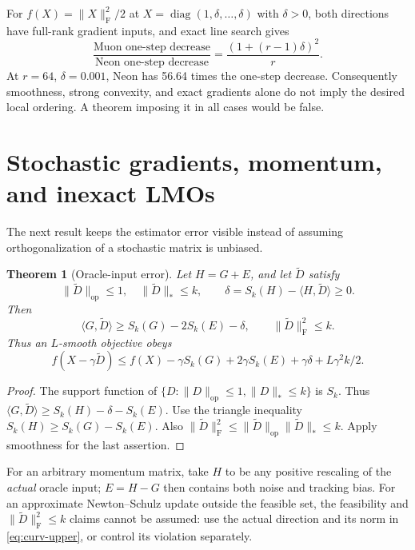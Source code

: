\documentclass[11pt]{article}
\newtheorem{theorem}{Theorem}[section]
\newcommand{\ip}[2]{\langle #1,#2\rangle}
\newcommand{\F}[1]{\lVert #1\rVert_{\mathrm F}}
\newcommand{\nuc}[1]{\lVert #1\rVert_*}
\newcommand{\op}[1]{\lVert #1\rVert_{\mathrm{op}}}
\begin{document}
For $f(X)=\F X^2/2$ at
$X=\operatorname{diag}(1,\delta,\ldots,\delta)$ with $\delta>0$, both
directions have full-rank gradient inputs, and exact line search gives
\[
 \frac{\text{Muon one-step decrease}}{\text{Neon one-step decrease}}
 =\frac{(1+(r-1)\delta)^2}{r}.
\]
At $r=64$, $\delta=0.001$, Neon has 56.64 times the one-step decrease.
Consequently smoothness, strong convexity, and exact gradients alone do
not imply the desired local ordering. A theorem imposing it in all cases
would be false.

\section{Stochastic gradients, momentum, and inexact LMOs}

The next result keeps the estimator error visible instead of assuming
orthogonalization of a stochastic matrix is unbiased.

\begin{theorem}[Oracle-input error]\label{thm:error}
Let $H=G+E$, and let $\widetilde D$ satisfy
\[
 \op{\widetilde D}\leq1,\quad\nuc{\widetilde D}\leq k,\qquad
 \delta=S_k(H)-\ip{H}{\widetilde D}\geq0.
\]
Then
\begin{equation}\label{eq:input-error}
 \ip{G}{\widetilde D}\geq S_k(G)-2S_k(E)-\delta,
 \qquad \F{\widetilde D}^2\leq k.
\end{equation}
Thus an $L$-smooth objective obeys
\begin{equation}\label{eq:noisy-decrease}
 f(X-\gamma\widetilde D)\leq f(X)
 -\gamma S_k(G)+2\gamma S_k(E)+\gamma\delta+L\gamma^2k/2.
\end{equation}
\end{theorem}
\begin{proof}
The support function of
$\{D:\op D\leq1,\nuc D\leq k\}$ is $S_k$.
Thus $\ip{G}{\widetilde D}\geq S_k(H)-\delta-S_k(E)$.
Use the triangle inequality $S_k(H)\geq S_k(G)-S_k(E)$.
Also $\F{\widetilde D}^2\leq\op{\widetilde D}\nuc{\widetilde D}\leq k$.
Apply smoothness for the last assertion.
\end{proof}

For an arbitrary momentum matrix, take $H$ to be any positive rescaling
of the \emph{actual} oracle input; $E=H-G$ then contains both noise and
tracking bias. For an approximate Newton--Schulz update outside the
feasible set, the feasibility and $\F{\widetilde D}^2\leq k$ claims cannot
be assumed: use the actual direction and its norm in
\eqref{eq:curv-upper}, or control its violation separately.
\end{document}
